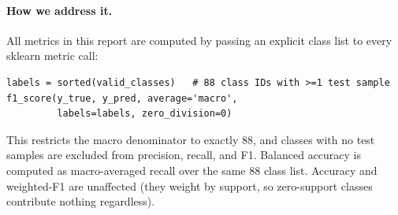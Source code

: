 \paragraph{How we address it.}
All metrics in this report are computed by passing an explicit class list
to every sklearn metric call:

\begin{verbatim}
labels = sorted(valid_classes)   # 88 class IDs with >=1 test sample
f1_score(y_true, y_pred, average='macro',
         labels=labels, zero_division=0)
\end{verbatim}

This restricts the macro denominator to exactly 88, and classes with no
test samples are excluded from precision, recall, and F1.
Balanced accuracy is computed as macro-averaged recall over the same 88
class list.
Accuracy and weighted-F1 are unaffected (they weight by support, so
zero-support classes contribute nothing regardless).
